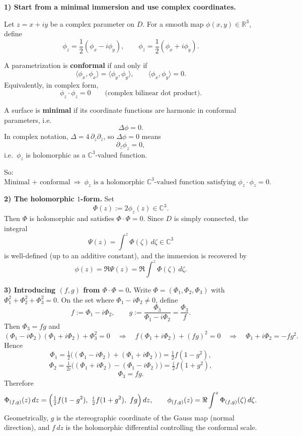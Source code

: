 \documentclass[12pt,a4paper]{article}
\theoremstyle{plain}
\theoremstyle{definition}      %
\begin{document}
\medskip
\textbf{1) Start from a minimal immersion and use complex coordinates.}

Let $z = x + iy$ be a complex parameter on $D$. For a smooth map $\phi(x,y) \in \mathbb{R}^3$, define
\[
\phi_z = \frac{1}{2}(\phi_x - i\phi_y),
\qquad
\phi_{\bar z} = \frac{1}{2}(\phi_x + i\phi_y).
\]

A parametrization is \textbf{conformal} if and only if
\[
\langle \phi_x,\phi_x\rangle = \langle \phi_y,\phi_y\rangle,
\qquad
\langle \phi_x,\phi_y\rangle = 0.
\]
Equivalently, in complex form,
\[
\phi_z \cdot \phi_z = 0
\qquad
\text{(complex bilinear dot product).}
\]

A surface is \textbf{minimal} if its coordinate functions are harmonic in conformal parameters, i.e.
\[
\Delta \phi = 0.
\]
In complex notation, $\Delta = 4\,\partial_z \partial_{\bar z}$, so $\Delta \phi = 0$ means
\[
\partial_{\bar z}\phi_z = 0,
\]
i.e.\ $\phi_z$ is holomorphic as a $\mathbb{C}^3$-valued function.

\medskip
So:
\[
\boxed{\text{Minimal + conformal} \ \Longrightarrow\  \phi_z \text{ is a holomorphic } \mathbb{C}^3\text{-valued function satisfying } \phi_z\cdot\phi_z = 0.}
\]

\smallskip
\textbf{2) The holomorphic $1$-form.}
Set
\[
\Phi(z):=2\phi_z(z)\in\mathbb C^3.
\]
Then $\Phi$ is holomorphic and satisfies $\Phi\cdot\Phi=0$.
Since $D$ is simply connected, the integral
\[
\Psi(z)=\int^z \Phi(\zeta)\,d\zeta\in\mathbb C^3
\]
is well-defined (up to an additive constant), and the immersion is recovered by
\[
\phi(z)=\Re\Psi(z)=\Re\int^z \Phi(\zeta)\,d\zeta.
\]

\smallskip
\textbf{3) Introducing $(f,g)$ from $\Phi\cdot\Phi=0$.}
Write $\Phi=(\Phi_1,\Phi_2,\Phi_3)$ with $\Phi_1^2+\Phi_2^2+\Phi_3^2=0$.
On the set where $\Phi_1-i\Phi_2\neq 0$, define
\[
f:=\Phi_1-i\Phi_2,\qquad g:=\frac{\Phi_3}{\Phi_1-i\Phi_2}=\frac{\Phi_3}{f}.
\]
Then $\Phi_3=fg$ and
\[
(\Phi_1-i\Phi_2)(\Phi_1+i\Phi_2)+\Phi_3^2=0
\quad\Longrightarrow\quad
f(\Phi_1+i\Phi_2)+(fg)^2=0
\quad\Longrightarrow\quad
\Phi_1+i\Phi_2=-fg^2.
\]
Hence
\[
\Phi_1=\tfrac12\bigl((\Phi_1-i\Phi_2)+(\Phi_1+i\Phi_2)\bigr)=\tfrac12 f(1-g^2),
\]
\[
\Phi_2=\tfrac{1}{2i}\bigl((\Phi_1+i\Phi_2)-(\Phi_1-i\Phi_2)\bigr)=\tfrac{i}{2} f(1+g^2),
\]
\[
\Phi_3=fg.
\]
Therefore
\[
\Phi_{(f,g)}(z)\,dz
=
\Bigl(\tfrac12 f(1-g^2),\ \tfrac{i}{2}f(1+g^2),\ fg\Bigr)\,dz,
\qquad
\phi_{(f,g)}(z)=\Re\int^z \Phi_{(f,g)}(\zeta)\,d\zeta.
\]
Geometrically, $g$ is the stereographic coordinate of the Gauss map (normal direction), and $f\,dz$
is the holomorphic differential controlling the conformal scale.
\end{document}
